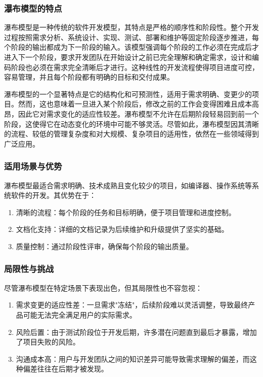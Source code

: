 \subsubsection{瀑布模型的特点}

瀑布模型是一种传统的软件开发模型，其特点是严格的顺序性和阶段性。整个开发过程按照需求分析、系统设计、实现、测试、部署和维护等固定阶段逐步推进，每个阶段的输出都成为下一阶段的输入。该模型强调每个阶段的工作必须在完成后才进入下一个阶段，要求开发团队在开始设计之前已完全理解和确定需求，设计和编码阶段也必须在需求完全清晰后才进行。这种线性的开发流程使得项目进度可控，容易管理，并且每个阶段都有明确的目标和交付成果。

瀑布模型的一个显著特点是它的结构化和可预测性，适用于需求明确、变更少的项目。然而，这也意味着一旦进入某个阶段后，修改之前的工作会变得困难且成本高昂，因此它对需求变化的适应性较差。瀑布模型不允许在后期阶段轻易回到前一个阶段，这使得它在动态变化的环境中可能不够灵活。尽管如此，瀑布模型因其清晰的流程、较低的管理复杂度和对大规模、复杂项目的适用性，依然在一些领域得到广泛应用。

\subsubsection{适用场景与优势}

瀑布模型最适合需求明确、技术成熟且变化较少的项目，如编译器、操作系统等系统软件的开发。其优势在于：

\begin{enumerate}
    \item 清晰的流程：每个阶段的任务和目标明确，便于项目管理和进度控制。
    \item 文档化支持：详细的文档记录为后续维护和升级提供了坚实的基础。
    \item 质量控制：通过阶段性评审，确保每个阶段的输出质量。
\end{enumerate}

\subsubsection{局限性与挑战}

尽管瀑布模型在特定场景下表现出色，但其局限性也不容忽视：

\begin{enumerate}
    \item 需求变更的适应性差：一旦需求"冻结"，后续阶段难以灵活调整，导致最终产品可能无法完全满足用户的实际需求。
    \item 风险后置：由于测试阶段位于开发后期，许多潜在问题直到最后才暴露，增加了项目失败的风险。
    \item 沟通成本高：用户与开发团队之间的知识差异可能导致需求理解的偏差，而这种偏差往往在后期才被发现。
\end{enumerate}

